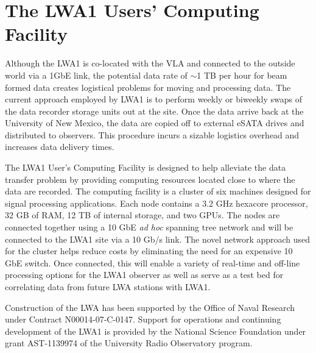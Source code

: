 \section{\label{P42_sec:LUCF}The LWA1 Users' Computing Facility}
Although the LWA1 is co-located with the VLA and connected to the outside world via a 1GbE link, the potential data rate of $\sim$1 TB per hour for beam formed data creates logistical problems for moving and processing data.  The current approach employed by LWA1 is to perform weekly or biweekly swaps of the data recorder storage units out at the site.  Once the data arrive back at the University of New Mexico, the data are copied off to external eSATA drives and distributed to observers.  This procedure incurs a sizable logistics overhead and increases data delivery times.

The LWA1 User's Computing Facility is designed to help alleviate the data transfer problem by providing computing resources located close to where the data are recorded.  The computing facility is a cluster of  six machines designed for signal processing applications.  Each node contains a 3.2 GHz hexacore processor, 32 GB of RAM, 12 TB of internal storage, and two GPUs.  The nodes are connected together using a 10 GbE {\it ad hoc} spanning tree network and will be connected to the LWA1 site via a 10 Gb/s link.  The novel network approach used for the cluster helps reduce costs by eliminating the need for an expensive 10 GbE switch.  Once connected, this will enable a variety of real-time and off-line processing options for the LWA1 observer as well as serve as a test bed for correlating data from future LWA stations with LWA1.

\acknowledgments Construction of the LWA has been supported by the Office of Naval Research under Contract N00014-07-C-0147.  Support for operations and continuing development of the LWA1 is provided by the National Science Foundation under grant AST-1139974 of the University Radio Observatory program.


